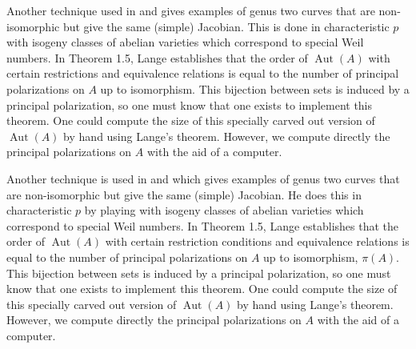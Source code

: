 \documentclass[12pt,reqno]{amsart}
\DeclareMathOperator{\Aut}{Aut}
\newcommand{\Q}{\mathbb{Q}}
\theoremstyle{definition}
\theoremstyle{remark}
\newtheorem*{remark}{Remark}
\begin{document}
Another technique used in \cite{howe1} and \cite{howe2} gives examples of genus two curves that are non-isomorphic but give the same (simple) Jacobian. This is done in characteristic $p$ with isogeny classes of abelian varieties which correspond to special Weil numbers. In \cite{several} Theorem 1.5, Lange establishes that the order of $\Aut(A)$ with certain restrictions and equivalence relations is equal to the number of principal polarizations on $A$ up to isomorphism. This bijection between sets is induced by a principal polarization, so one must know that one exists to implement this theorem. One could compute the size of this specially carved out version of $\Aut(A)$ by hand using Lange's theorem. However, we compute directly the principal polarizations on $A$ with the aid of a computer.

Another technique is used in \cite{howe1} and \cite{howe2} which gives examples of genus two curves that are non-isomorphic but give the same (simple) Jacobian. He does this in characteristic $p$ by playing with isogeny classes of abelian varieties which correspond to special Weil numbers. In \cite{several} Theorem 1.5, Lange establishes that the order of $\Aut(A)$ with certain restriction conditions and equivalence relations is equal to the number of principal polarizations on $A$ up to isomorphism, $\pi(A)$. This bijection between sets is induced by a principal polarization, so one must know that one exists to implement this theorem. One could compute the size of this specially carved out version of $\Aut(A)$ by hand using Lange's theorem. However, we compute directly the principal polarizations on $A$ with the aid of a computer.


\end{document}
